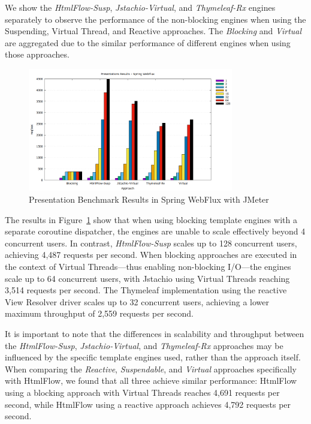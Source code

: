 We show the \textit{HtmlFlow-Susp}, \textit{Jstachio-Virtual}, and
\textit{Thymeleaf-Rx} engines separately to observe the performance of the
non-blocking engines when using the Suspending, Virtual Thread, and Reactive
approaches. The \textit{Blocking} and \textit{Virtual} are aggregated due to
the similar performance of different engines when using those approaches.

\begin{figure}[h]
     \centering
     \includegraphics[width=0.8\textwidth]{./Graphs/presentations-webflux-jmeter.png}
     \caption{Presentation Benchmark Results in Spring WebFlux with JMeter}\label{fig:presentations-webflux-jmeter}
\end{figure}

The results in Figure~\ref{fig:presentations-webflux-jmeter} show that when
using blocking template engines with a separate coroutine dispatcher, the
engines are unable to scale effectively beyond 4 concurrent users. In contrast,
\textit{HtmlFlow-Susp} scales up to 128 concurrent users, achieving 4,487
requests per second. When blocking approaches are executed in the context of
Virtual Threads—thus enabling non-blocking I/O—the engines scale up to 64
concurrent users, with Jstachio using Virtual Threads reaching 3,514 requests
per second. The Thymeleaf implementation using the reactive View Resolver
driver scales up to 32 concurrent users, achieving a lower maximum throughput
of 2,559 requests per second.

It is important to note that the differences in scalability and throughput
between the \textit{HtmlFlow-Susp}, \textit{Jstachio-Virtual}, and
\textit{Thymeleaf-Rx} approaches may be influenced by the specific template
engines used, rather than the approach itself. When comparing the
\textit{Reactive}, \textit{Suspendable}, and \textit{Virtual} approaches
specifically with HtmlFlow, we found that all three achieve similar
performance: HtmlFlow using a blocking approach with Virtual Threads reaches
4,691 requests per second, while HtmlFlow using a reactive approach achieves
4,792 requests per second.

